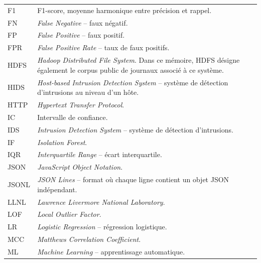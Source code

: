 \begin{longtable}{p{3.2cm}p{11.2cm}}
F1 &
F1-score, moyenne harmonique entre précision et rappel. \\

FN &
\textit{False Negative} -- faux négatif. \\

FP &
\textit{False Positive} -- faux positif. \\

FPR &
\textit{False Positive Rate} -- taux de faux positifs. \\

HDFS &
\textit{Hadoop Distributed File System}. Dans ce mémoire, HDFS désigne
également le corpus public de journaux associé à ce système. \\

HIDS &
\textit{Host-based Intrusion Detection System} -- système de détection
d'intrusions au niveau d'un hôte. \\

HTTP &
\textit{Hypertext Transfer Protocol}. \\

IC &
Intervalle de confiance. \\

IDS &
\textit{Intrusion Detection System} -- système de détection d'intrusions. \\

IF &
\textit{Isolation Forest}. \\

IQR &
\textit{Interquartile Range} -- écart interquartile. \\

JSON &
\textit{JavaScript Object Notation}. \\

JSONL &
\textit{JSON Lines} -- format où chaque ligne contient un objet JSON
indépendant. \\

LLNL &
\textit{Lawrence Livermore National Laboratory}. \\

LOF &
\textit{Local Outlier Factor}. \\

LR &
\textit{Logistic Regression} -- régression logistique. \\

MCC &
\textit{Matthews Correlation Coefficient}. \\

ML &
\textit{Machine Learning} -- apprentissage automatique. \\


\end{longtable}
